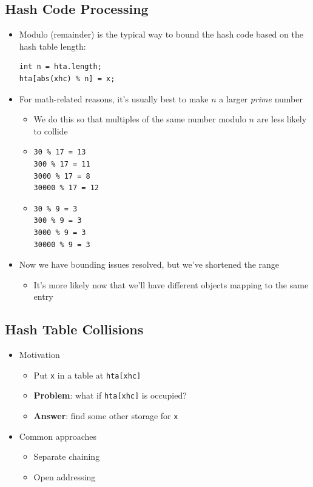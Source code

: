 \documentclass[10pt]{article}
\begin{document}
\subsection*{Hash Code Processing}
\begin{itemize}
    \item Modulo (remainder) is the typical way to bound the hash code based on the hash table length:
    \begin{verbatim}
int n = hta.length;
hta[abs(xhc) % n] = x;        
    \end{verbatim}
    \item For math-related reasons, it's usually best to make $n$ a larger \textit{prime} number
    \begin{itemize}
        \item We do this so that multiples of the same number modulo $n$ are less likely to collide
    \end{itemize}
    \begin{multicols}{2}
    \begin{itemize}
        \item[]\begin{verbatim}
30 % 17 = 13
300 % 17 = 11
3000 % 17 = 8
30000 % 17 = 12
        \end{verbatim}
        \item[]\begin{verbatim}
30 % 9 = 3
300 % 9 = 3
3000 % 9 = 3
30000 % 9 = 3
        \end{verbatim}
    \end{itemize}
    \end{multicols}
    \item Now we have bounding issues resolved, but we've shortened the range
    \begin{itemize}
        \item It's more likely now that we'll have different objects mapping to the same entry
    \end{itemize}
\end{itemize}

\subsection*{Hash Table Collisions}
\begin{itemize}
    \item Motivation
    \begin{itemize}
        \item Put \texttt{x} in a table at \texttt{hta[xhc]}
        \item \textbf{Problem}: what if \texttt{hta[xhc]} is occupied?
        \item \textbf{Answer}: find some other storage for \texttt{x}
    \end{itemize}
    \item Common approaches
    \begin{itemize}
        \item Separate chaining
        \item Open addressing
    \end{itemize}
\end{itemize}
\end{document}
